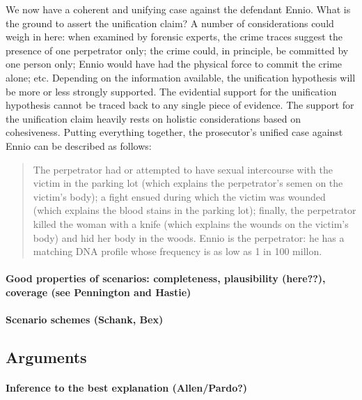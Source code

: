 \documentclass[10pt]{article}
\begin{document}
We now have a coherent and unifying case against the defendant Ennio.
What is the ground to assert the unification claim? A number of considerations could 
weigh in here: when examined by forensic experts, the crime traces suggest the presence of one perpetrator only; the crime could, in principle, be committed by one person only; Ennio would have had the physical force to commit the crime alone; etc. Depending on the information available, the unification hypothesis will be 
more or less strongly supported. The evidential support for the unification hypothesis cannot be traced back to any single piece of evidence. The support for the unification claim heavily
rests on holistic considerations based on cohesiveness.
Putting everything together, the prosecutor's unified case against 
Ennio can be described as follows:
%
\begin{quote}
\begin{singlespace}
The perpetrator  had or attempted to have sexual intercourse with the victim in the parking lot (which explains the perpetrator's 
semen on the victim's body); a fight ensued during which the victim was wounded (which explains the blood stains in the parking lot); finally, the perpetrator killed the woman with a knife (which explains the wounds on the victim's body) and hid her body in the woods. 
Ennio is the perpetrator: he has a matching DNA profile whose frequency is as low as 1 in 100 millon.
\end{singlespace}
\end{quote}
%



\paragraph{	Good properties of scenarios: completeness, plausibility (here??), coverage (see Pennington and Hastie)}

\paragraph{	Scenario schemes (Schank, Bex)}

\subsection{Arguments}

\paragraph{Inference to the best explanation (Allen/Pardo?)}
\end{document}
